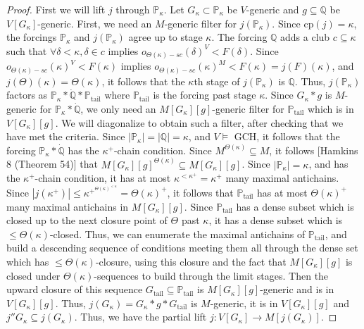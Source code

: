 \documentclass[10pt,leqno]{amsart}
\begin{document}
\begin{proof}
 First we will lift $j$ through $\mathbb{P}_{\kappa}$. Let $G_{\kappa} \subset \mathbb{P}_{\kappa}$ be $V$-generic and $g \subseteq \mathbb{Q}$ be $V[G_{\kappa}]$-generic. First, we need an $M$-generic filter for $j(\mathbb{P}_{\kappa})$. Since cp$(j) = \kappa$, the forcings $\mathbb{P}_{\kappa}$ and $j(\mathbb{P}_{\kappa})$ agree up to stage $\kappa$. The forcing $\mathbb{Q}$ adds a club $c \subseteq \kappa$ such that $\forall \delta < \kappa, \delta \in c$ implies $o_{\Theta(\kappa)-sc}(\delta)^V < F(\delta)$. Since $o_{\Theta(\kappa)-sc}(\kappa)^V < F(\kappa)$ implies $o_{\Theta(\kappa)-sc}(\kappa)^M < F(\kappa) = j(F)(\kappa)$, and $j(\Theta)(\kappa) = \Theta(\kappa)$, it follows that the $\kappa$th stage of $j(\mathbb{P}_{\kappa})$ is $\mathbb{Q}$. Thus, $j(\mathbb{P}_{\kappa})$ factors as $\mathbb{P}_{\kappa}*\dot{\mathbb{Q}}*\mathbb{P}_{\mbox{tail}}$ where $\mathbb{P}_{\mbox{tail}}$ is the forcing past stage $\kappa$. Since $G_{\kappa}*g$ is $M$-generic for $\mathbb{P}_{\kappa}*\dot{\mathbb{Q}}$, we only need an $M[G_{\kappa}][g]$-generic filter for $\mathbb{P}_{\mbox{tail}}$ which is in $V[G_{\kappa}][g]$. We will diagonalize to obtain such a filter, after checking that we have met the criteria. Since $|\mathbb{P}_{\kappa}|=|\mathbb{Q}| = \kappa$, and $V \models $ GCH, it follows that the forcing $\mathbb{P}_{\kappa}*\dot{\mathbb{Q}}$ has the $\kappa^+$-chain condition. Since $M^{\Theta(\kappa)} \subseteq M$, it follows [Hamkins 8 (Theorem 54)] that $M[G_{\kappa}][g]^{\Theta(\kappa)} \subseteq M[G_{\kappa}][g]$. Since $|\mathbb{P}_{\kappa}| = \kappa$, and has the $\kappa^+$-chain condition, it has at most $\kappa^{<\kappa^+} = \kappa^+$ many maximal antichains. Since $|j(\kappa^+)| \le \kappa^{+^{\Theta(\kappa)^{< \kappa}}} = \Theta(\kappa)^+$, it follows that $\mathbb{P}_{\mbox{tail}}$ has at most $\Theta(\kappa)^+$ many maximal antichains in $M[G_{\kappa}][g]$. Since $\mathbb{P}_{\mbox{tail}}$ has a dense subset which is closed up to the next closure point of $\Theta$ past $\kappa$, it has a dense subset which is $\le \Theta(\kappa)$-closed. Thus, we can enumerate the maximal antichains of $\mathbb{P}_{\mbox{tail}}$, and build a descending sequence of conditions meeting them all through the dense set which has $\le \Theta(\kappa)$-closure, using this closure and the fact that $M[G_{\kappa}][g]$ is closed under $\Theta(\kappa)$-sequences to build through the limit stages. Then the upward closure of this sequence $G_{\mbox{tail}} \subseteq \mathbb{P}_{\mbox{tail}}$ is $M[G_{\kappa}][g]$-generic and is in $V[G_{\kappa}][g]$. Thus, $j(G_{\kappa}) = G_{\kappa}*g*G_{\mbox{tail}}$ is $M$-generic, it is in $V[G_{\kappa}][g]$ and $j''G_{\kappa} \subseteq j(G_{\kappa})$. Thus, we have the partial lift $j: V[G_{\kappa}] \to M[j(G_{\kappa})]$.


\end{proof}
\end{document}
